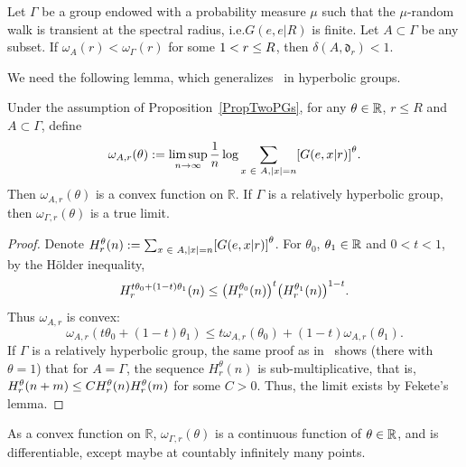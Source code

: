 \documentclass[AHL,Unicode,longabstracts]{cedram}
\newcommand{\R}{\mathbb{R}}
\newcommand{\fkd}{\mathfrak{d}}
\let\originalleft\left
\let\originalright\right
\renewcommand{\left}{\mathopen{}\mathclose\bgroup\originalleft}
\renewcommand{\right}{\aftergroup\egroup\originalright}
\let\oldin\in
\renewcommand{\in}{\mathchoice{\oldin}{\oldin}{\,\oldin\,}{\,\oldin\,}}
\let\oldle\le
\renewcommand{\le}{\mathchoice{\oldle}{\oldle}{\,\oldle\,}{\,\oldle\,}}
\renewcommand*{\to}{\mathchoice{\longrightarrow}{\rightarrow}{\rightarrow}{\rightarrow}}
\begin{document}
\begin{prop}\label{PropTwoPGs}
Let $\Gamma$ be a group endowed with a probability measure $\mu$ such that the $\mu$-random walk is transient at the spectral radius, i.e.$G(e,e|R)$ is finite. Let $A\subset \Gamma$ be any subset. If $\omega_A(r)<\omega_\Gamma(r)$ for some $1<r\le R $, then $\delta(A,\fkd_r)<1$.
\end{prop}

We need the following lemma, which generalizes~\cite[Lemma~3.1]{Tanaka17} in hyperbolic groups.
\begin{lemm}\label{ContinuitythetaLem}
Under the assumption of Proposition~\ref{PropTwoPGs}, for any $\theta\in\R$, $r\leq R$ and $A\subset \Gamma$, define
\[
\omega_{A, r}(\theta) := \limsup_{n \to \infty} \frac{1}{n} \log \sum_{x \in A, |x| = n} \left[G(e, x | r) \right]^\theta.
\]
Then $\omega_{A, r}(\theta)$ is a convex function on $\R$. If $\Gamma$ is a relatively hyperbolic group, then $\omega_{\Gamma, r}(\theta)$ is a true limit.
\end{lemm}
\begin{proof}
Denote $H^\theta_r(n):=\sum_{x \in A, |x| = n} \left[G(e, x | r) \right]^\theta$. For $\theta_0$, $\theta_1 \in \R$ and $0 < t < 1$, by the H\"older inequality,
\[
H_r^{t \theta_0 + (1 - t) \theta_1}(n)
\leq \left(H_r^{\theta_0}(n)\right)^t \left(H_r^{\theta_1}(n)\right)^{1 - t}.
\]
Thus $\omega_{A, r}$ is convex:
\[
\omega_{A, r}(t \theta_0 + (1 - t) \theta_1) \leq t \omega_{A, r}(\theta_0) + (1 - t) \omega_{A, r}(\theta_1).
\]
If $\Gamma$ is a relatively hyperbolic group, the same proof as in~\cite[Lemma~3.2]{DWY} shows (there with $\theta=1$) that for $A=\Gamma$, the sequence $H_r^\theta(n)$ is sub-multiplicative, that is, $H_r^\theta(n+m)\le C H_r^\theta(n) H_r^\theta(m)$ for some $C>0$. Thus, the limit exists by Fekete's lemma.
\end{proof}

As a convex function on $\R$, $\omega_{\Gamma, r}(\theta)$ is a continuous function of $\theta\in \R$, and is differentiable, except maybe at countably infinitely many points.
\end{document}
